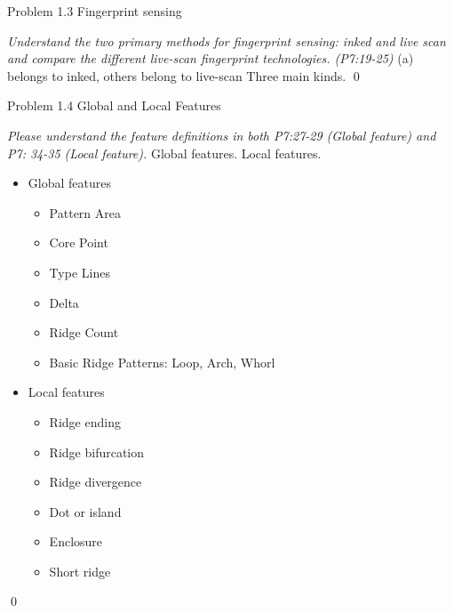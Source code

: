 \documentclass[
        ]{beamer}
\begin{document}
    		\begin{frame}[t]{Problem 1.3 Fingerprint sensing}
    			\begin{overprint}
    			\emph{Understand the two primary methods for fingerprint sensing: inked and live scan and compare the different live-scan fingerprint technologies. (P7:19-25)}
    				\onslide<2>  %
    				(a) belongs to inked, others belong to live-scan
    				\onslide<3>  %
    				Three main kinds.
    				\onslide<4>  %
    				\onslide<5>  %
    				\onslide<6>  %
    				\onslide<7>  %
    				\onslide<8>  %
							\qed		
    			\end{overprint}
    		\end{frame}
    
    		\begin{frame}[t]{Problem 1.4 Global and Local Features}
    			\begin{overprint}
    				\onslide<1>
    			\emph{Please understand the feature definitions in both P7:27-29 (Global feature) and P7: 34-35 (Local feature).  }
    				\onslide<2> \inpdfc{7}{27} %
    				Global features.
    				\onslide<3> \inpdfc{7}{28} %
    				\onslide<4> \inpdfc{7}{29} %
    				\onslide<5> \inpdfc{7}{34} %
    				\onslide<6> \inpdfc{7}{35} %
    				Local features.
    				\onslide<7> 
    				\begin{itemize}
    				\item Global features  				
    					\begin{itemize}
    					\item Pattern Area
    					\item Core Point
    					\item Type Lines
    					\item Delta
    					\item Ridge Count
    					\item Basic Ridge Patterns: Loop, Arch, Whorl
    					\end{itemize}		
    				\item Local features  				
    					\begin{itemize}
    					\item Ridge ending
    					\item Ridge bifurcation
    					\item Ridge divergence
    					\item Dot or island
    					\item Enclosure
    					\item Short ridge
    					\end{itemize}	
    				\end{itemize}							\qed		
    			\end{overprint}
    		\end{frame}
    
\end{document}
